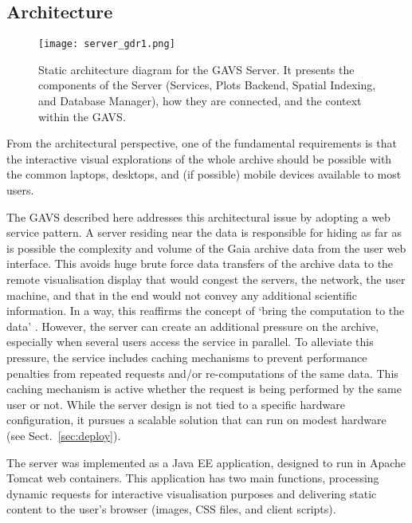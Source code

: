\documentclass[longauth, final]{aa}
\begin{document}
\subsection{Architecture}

\begin{figure*}[!htbp]
\centering
    \texttt{[image: server\_gdr1.png]}
  \caption{Static architecture diagram for the GAVS Server. It presents the components of the Server (Services, Plots Backend, Spatial Indexing, and Database Manager), how they are connected, and the context within the GAVS.}\label{fig:server_diagram} 
\end{figure*}

From the architectural perspective, one of the fundamental requirements is that the interactive visual explorations of the whole archive should be possible with the common laptops, desktops, and  (if possible) mobile devices available to most users. 

The GAVS described here addresses this architectural issue by adopting a web service pattern. A server residing near the data is responsible for hiding as far as is possible the complexity and volume of the Gaia archive data from the user web interface. This avoids huge brute force data transfers of the archive data to the remote visualisation display that would congest the servers, the network, the user machine, and that in the end would not convey any additional scientific information. In a way,  this reaffirms the concept of `bring the computation to the data' \citep{hey:fourthparadigm:2009}.
However, the server can create an additional pressure on the archive, especially when several users access the service in parallel. To alleviate this pressure, the service includes caching mechanisms to prevent performance penalties from repeated requests and/or re-computations of the same data. This caching mechanism is active whether the request is being performed by the same user or not.
While the server design is not tied to a specific hardware configuration, it pursues a scalable solution that can run on modest hardware (see Sect.~\ref{sec:deploy}).


The server was implemented as a Java EE application, designed to run in Apache Tomcat web containers. This application has two main functions, processing dynamic requests for interactive visualisation purposes and delivering static content to the user’s browser (images, CSS files, and client scripts).
\end{document}

